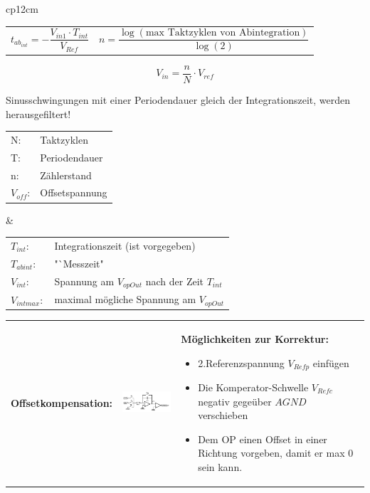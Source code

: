 \begin{longtable}{cp{12cm}}
\begin{tabular}{p{4cm}p{7cm}}
      \[ t_{ab_{int}} = -\dfrac{V_{in1} \cdot T_{int}}{V_{Ref}} \] &
      \[ n = \dfrac{\log (\text{max Taktzyklen von Abintegration})}{\log(2)} \] 
  \end{tabular}
  \[ V_{in} = \frac{n}{N} \cdot V_{ref} \]
  
 Sinusschwingungen mit einer Periodendauer gleich der Integrationszeit, werden herausgefiltert!\\
 
  \begin{tabular}{ll}
    N:&Taktzyklen\\
    T:&Periodendauer\\
    n:&Zählerstand\\
    $V_{off}$:&Offsetspannung\\
  \end{tabular} &
  
  \begin{tabular}{ll}
    $T_{int}$:&Integrationszeit (ist vorgegeben)\\
    $T_{abint}$:& "`Messzeit"\\
    $V_{int}$:&Spannung am $V_{opOut}$ nach der Zeit $T_{int}$\\
    $V_{intmax}:$&maximal mögliche Spannung am $V_{opOut}$\\
  \end{tabular}
\end{longtable}

\begin{longtable}{p{4cm}p{6cm}p{8cm}}
  \textbf{Offsetkompensation:} &
  \includegraphics[width=6cm, valign=t]{pictures/offsetkompensation} &
  \textbf{Möglichkeiten zur Korrektur:}
  \begin{itemize}
    \item 2.Referenzspannung $V_{Refp}$ einfügen
    \item Die Komperator-Schwelle $V_{Refc}$ negativ gegeüber $AGND$ verschieben
    \item Dem OP einen Offset in einer Richtung vorgeben, damit er max 0 sein kann.
  \end{itemize}
\end{longtable}

\newpage

